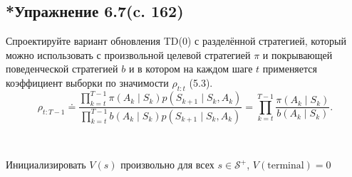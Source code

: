 \subsection{*Упражнение 6.7(c. 162)}
Спроектируйте вариант обновления TD(0) с разделённой стратегией, который можно использовать с произвольной целевой стратегией $\pi$ и покрывающей поведенческой стратегией $b$ и в котором на каждом шаге $t$ применяется коэффициент выборки по значимости $\rho_{t:t}$ (5.3).
\begin{equation}
    \rho_{t:T-1} \doteq \frac{\prod_{k=t}^{T-1} \pi(A_k \mid S_k) p(S_{k+1} \mid S_k, A_k)}{\prod_{k=t}^{T-1} b(A_k \mid S_k) p(S_{k+1} \mid S_k, A_k)} = \prod_{k=t}^{T-1} \frac{\pi(A_k \mid S_k)}{b(A_k \mid S_k)}.
    \tag{5.3}
\end{equation}
\begin{solution}
    \leavevmode\\
    \begin{algorithm}[H]
        \DontPrintSemicolon
        \KwIn{целевая стратегия $\pi$, поведенческая стратегия $b$ (с покрытием $\pi$), шаг $\alpha \in (0, 1]$}
        Инициализировать $V(s)$ произвольно для всех $s \in \mathcal{S}^+$, $V(\text{terminal}) = 0$\;
        \caption{Off-policy TD(0) с одношаговым коэффициентом важности}
    \end{algorithm}
\end{solution}

